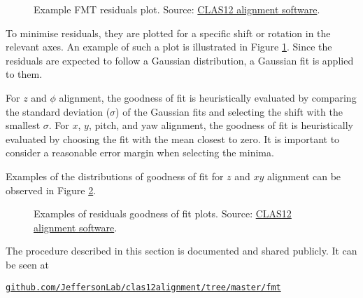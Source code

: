     \begin{figure}[b!]
        \centering{}
        \caption[Example FMT residuals plot]{Example FMT residuals plot.
        Source: \href{https://github.com/JeffersonLab/clas12alignment}{CLAS12 alignment software}.}
        \label{fig::12.20::fmt_residuals_example}
    \end{figure}

    To minimise residuals, they are plotted for a specific shift or rotation in the relevant axes.
    An example of such a plot is illustrated in Figure \ref{fig::12.20::fmt_residuals_example}.
    Since the residuals are expected to follow a Gaussian distribution, a Gaussian fit is applied to them.

    For $z$ and $\phi$ alignment, the goodness of fit is heuristically evaluated by comparing the standard deviation ($\sigma$) of the Gaussian fits and selecting the shift with the smallest $\sigma$.
    For $x$, $y$, pitch, and yaw alignment, the goodness of fit is heuristically evaluated by choosing the fit with the mean closest to zero.
    It is important to consider a reasonable error margin when selecting the minima.

    Examples of the distributions of goodness of fit for $z$ and $xy$ alignment can be observed in Figure \ref{fig::12.20::fmt_residuals_fit_example}.

    \begin{figure}[t!]
        \centering{}
        \caption[Examples of residuals goodness of fit plots]{Examples of residuals goodness of fit plots.
        Source: \href{https://github.com/JeffersonLab/clas12alignment}{CLAS12 alignment software}.}
        \label{fig::12.20::fmt_residuals_fit_example}
    \end{figure}

    
    

    The procedure described in this section is documented and shared publicly.
    It can be seen at

    \href{https://github.com/JeffersonLab/clas12alignment/tree/master/fmt}{\texttt{github.com/JeffersonLab/clas12alignment/tree/master/fmt}}
